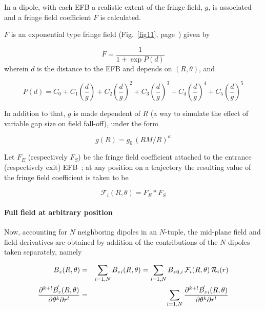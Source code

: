 \noindent In a dipole, with  each EFB a realistic extent of the fringe field, $g $, 
is associated and a fringe field coefficient $ F $ is calculated. 


\bigskip

\noindent$ F $ is an exponential type fringe field (Fig.~\ref{fig11}, page~\pageref{fig11}) 
given by~\cite{Biblio12}     %

$$ F = \frac{1 }{ 1+ \exp P(d)} $$
%
 wherein $ d $ is the distance to the EFB and depends on $(R,\theta)$, and 

$$
    P(d) = C_0
       +C_1 \left(  \dfrac{d }{ g } \right) 
       +C_2 \left( \dfrac{d }{ g } \right)^2 
       + C_3 \left( \dfrac{d }{ g } \right)^3 
       +C_4 \left( \dfrac{d }{ g } \right)^4 
       + C_5 \left(\dfrac{d }{ g } \right)^5 $$

\noindent In addition to that,   $g$ is made dependent  of $R$ 
(a way to simulate the effect of variable gap size on field fall-off), 
under the form 

$$ g(R) = g_0 \, (RM/R)^{\kappa}  $$


\smallskip

\noindent Let $ F_E $ (respectively $ F_S$)  be the fringe field
coefficient attached to the entrance (respectively exit) EFB~; at any position on  a 
trajectory the resulting value of the fringe field coefficient is taken to be 

\begin{equation}
\label{EqFFdips}
  \mathcal{F}_i(R,\theta) = F_E  \ast  F_S 
\end{equation}



\paragraph{Full field at arbitrary position \label{FFatAP}}

 
\noindent Now, accounting for   $N$ neighboring dipoles in an $N$-tuple,  the mid-plane field  and field derivatives  
are  obtained by addition of  the  contributions of the $N$ dipoles taken separately, namely

\begin{eqnarray}
\label{EqSumB}
{B_z}(R,\theta) &=&  \sum_{i=1,N} {B_z}_i(R,\theta)   =  \sum_{i=1,N} {B_z}_{0,i} \, \mathcal{F}_i(R,\theta) 
\,  \mathcal{R}_i(r)  \nonumber \\
\frac{\partial^{ k+l}\vec {{B_z}}(R,\theta) }{ \partial \theta^k\partial r^l} &=&  \sum_{i=1,N} 
\frac{\partial^{ k+l}\vec {{B_z}}_i(R,\theta) }{ \partial \theta^k\partial r^l} 
\end{eqnarray}

